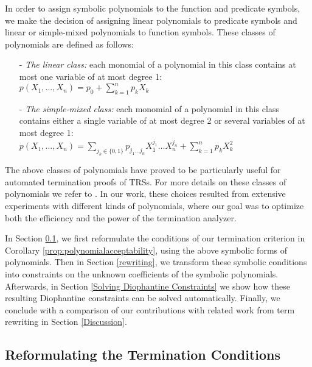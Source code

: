 \documentclass[envcountsame]{tlp}
\newcounter{ex:der-lastsymconsctr}
\begin{document}
In order to assign symbolic polynomials to the function and predicate symbols,
we make the decision of assigning linear polynomials to predicate symbols
and linear or simple-mixed polynomials to function symbols.
These classes of polynomials are defined as follows:
\begin{enumerate}
\item[-] \emph{The linear class:} each monomial of a polynomial in this class
contains at most one variable of at most degree 1:\\
$p(X_1,\ldots,X_n)=p_0+\sum_{k=1}^{n} p_k X_k$  \vspace*{.2cm}
\item[-] \emph{The simple-mixed class:} each monomial of a polynomial in this
class contains either a single variable of at most degree 2 or several
variables of at most degree 1:\\ 
$p(X_1,\ldots,X_n)=\sum_{j_k \in \{0,1\}} p_{j_1{\ldots}j_n} X^{j_1}_1 \ldots X^{j_n}_n
+ \sum_{k=1}^{n} p_k X^2_k$
\end{enumerate}
The above classes of polynomials have proved to be particularly useful for
automated termination proofs of TRSs. 
For more details on these classes of polynomials we refer to
\cite{contejean05jar,Steinbach92}.
In our work, these choices resulted from extensive experiments
with different kinds of polynomials, where our goal was to optimize both the
efficiency and the power of the termination analyzer.








In Section \ref{Reformulating 
the Termination Conditions Symbolically}, we first reformulate the conditions
of our termination criterion in  Corollary
\ref{prop:polynomialacceptability}, using the above symbolic forms of
polynomials. Then in Section \ref{rewriting}, we transform these symbolic conditions
into constraints on the unknown coefficients of the symbolic polynomials. Afterwards, 
in Section \ref{Solving Diophantine Constraints} we show how these resulting
Diophantine constraints 
can be solved automatically. Finally, we conclude with a comparison of our
contributions with related work from term rewriting in Section \ref{Discussion}. 


\subsection{Reformulating the Termination Conditions}\label{Reformulating 
the Termination Conditions Symbolically}
\end{document}
